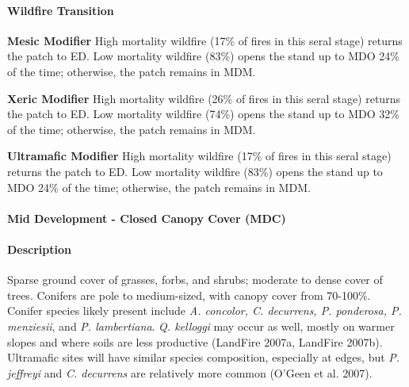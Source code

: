 \paragraph{Wildfire Transition}
\begin{adjustwidth}{2cm}{}
\textbf{Mesic Modifier } High mortality wildfire (17\% of fires in this seral stage) returns the patch to ED. Low mortality wildfire (83\%) opens the stand up to MDO 24\% of the time; otherwise, the patch remains in MDM. 

\medskip
\noindent \textbf{Xeric Modifier}  High mortality wildfire (26\% of fires in this seral stage) returns the patch to ED. Low mortality wildfire (74\%) opens the stand up to MDO 32\% of the time; otherwise, the patch remains in MDM.

\medskip
\noindent \textbf{Ultramafic Modifier} High mortality wildfire (17\% of fires in this seral stage) returns the patch to ED. Low mortality wildfire (83\%) opens the stand up to MDO 24\% of the time; otherwise, the patch remains in MDM.

\end{adjustwidth}

\noindent\hrulefill

\paragraph{Mid Development - Closed Canopy Cover (MDC)}

\paragraph{Description} Sparse ground cover of grasses, forbs, and shrubs; moderate to dense cover of trees. Conifers are pole to medium-sized, with canopy cover from 70-100\%. Conifer species likely present include \emph{A. concolor, C. decurrens, P. ponderosa, P. menziesii}, and \emph{P. lambertiana}. \emph{Q. kelloggi} may occur as well, mostly on warmer slopes and where soils are less productive (LandFire 2007a, LandFire 2007b). Ultramafic sites will have similar species composition, especially at edges, but \emph{P. jeffreyi} and \emph{C. decurrens} are relatively more common (O'Geen et al. 2007).

